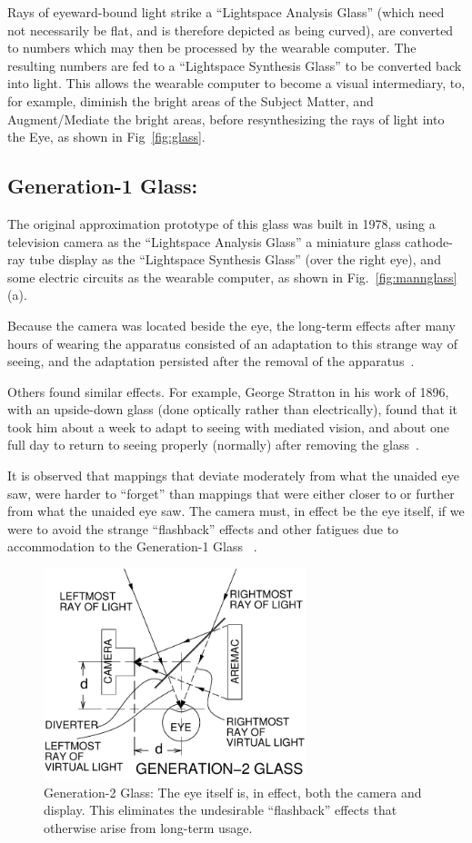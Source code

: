 Rays of eyeward-bound light strike a ``Lightspace Analysis Glass'' (which need not necessarily be flat, 
and is therefore depicted as being curved), are converted to numbers which may then be processed 
by the wearable computer. The resulting numbers are fed to a ``Lightspace Synthesis Glass'' to be 
converted back into light.  This allows the wearable computer to become a visual intermediary, to, for 
example, diminish the bright areas
of the Subject Matter, and Augment/Mediate the bright areas, before resynthesizing the rays of light 
into the Eye, as shown in Fig~\ref{fig:glass}.

\subsection{Generation-1 Glass:}
The original approximation prototype of this glass was built in 1978, using a television camera as the 
``Lightspace Analysis Glass'' a miniature glass cathode-ray tube display as the ``Lightspace Synthesis 
Glass'' (over the right eye), and some electric circuits as the wearable computer, as shown in 
Fig.~\ref{fig:mannglass} (a).

Because the camera was located beside the eye, the long-term effects after many hours of wearing 
the apparatus consisted of an adaptation to this strange way of seeing, and the adaptation persisted 
after the removal of the apparatus~\cite{mann1994mediated}. 

Others found similar effects. For example, George Stratton in his work of 1896, with an upside-down 
glass
(done optically rather than electrically), found that it took him about a week to adapt to seeing with 
mediated vision, and about one full day to return to seeing properly (normally) after removing the 
glass~\cite{stratton1897vision}.

It is observed that mappings that deviate moderately from what the unaided eye saw, were harder to 
``forget'' than mappings that were either closer to or further from what the unaided eye saw.  The 
camera must, in effect be the eye itself, if we were to avoid the strange ``flashback'' effects and other 
fatigues due to accommodation to the Generation-1 Glass ~\cite{schor1987fatigue}.

\begin{figure}
  \center
  \includegraphics[width=3.0in]{ch6/figs/GlassGen2.pdf}
  \caption{Generation-2 Glass: The eye itself is, in effect, both the camera
           and display.  This eliminates the undesirable ``flashback'' effects
           that otherwise arise from long-term usage.}
  \label{fig:gentwo}
\end{figure}

